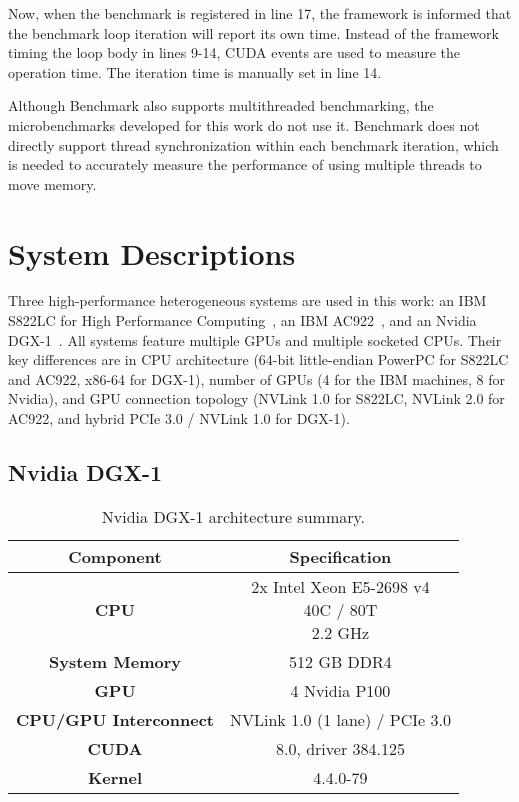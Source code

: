 Now, when the benchmark is registered in line 17, the framework is informed that the benchmark loop iteration will report its own time.
Instead of the framework timing the loop body in lines 9-14, CUDA events are used to measure the operation time.
The iteration time is manually set in line 14.

Although Benchmark also supports multithreaded benchmarking, the microbenchmarks developed for this work do not use it.
Benchmark does not directly support thread synchronization within each benchmark iteration, which is needed to accurately measure the performance of using multiple threads to move memory.

\section{System Descriptions}
\label{sec:system-descriptions}

Three high-performance heterogeneous systems are used in this work: an IBM S822LC for High Performance Computing~\cite{caldeira2016s822lc}, an IBM AC922~\cite{caldeira2018ac922}, and an Nvidia DGX-1~\cite{nvidia2017dgx1}.
All systems feature multiple GPUs and multiple socketed CPUs.
Their key differences are in CPU architecture (64-bit little-endian PowerPC for S822LC and AC922, x86-64 for DGX-1), number of GPUs (4 for the IBM machines, 8 for Nvidia), and GPU connection topology (NVLink 1.0 for S822LC, NVLink 2.0 for AC922, and hybrid PCIe 3.0 / NVLink 1.0 for DGX-1).

\subsection{Nvidia DGX-1}
\label{sec:dgx1}

\begin{table}[ht]
    \centering
    \caption[Nvidia DGX-1 architecture summary]{
		Nvidia DGX-1 architecture summary.
	}
    \label{tab:dgx1}
    \begin{tabular}{cc}
    \hline
    \textbf{Component}            & \textbf{Specification}                                      \\ \hline
    \textbf{CPU}                  & \makecell{2x Intel Xeon E5-2698 v4 \\ 40C / 80T \\ 2.2 GHz} \\ \hline
    \textbf{System Memory}        & 512 GB DDR4                                                 \\ \hline
	\textbf{GPU}                  & 4 Nvidia P100                                               \\ \hline
	\textbf{CPU/GPU Interconnect} & NVLink 1.0 (1 lane) / PCIe 3.0                              \\ \hline
	\textbf{CUDA}                 & 8.0, driver 384.125                                         \\ \hline
	\textbf{Kernel}               & 4.4.0-79                                                    \\ \hline
    \end{tabular}
\end{table}


